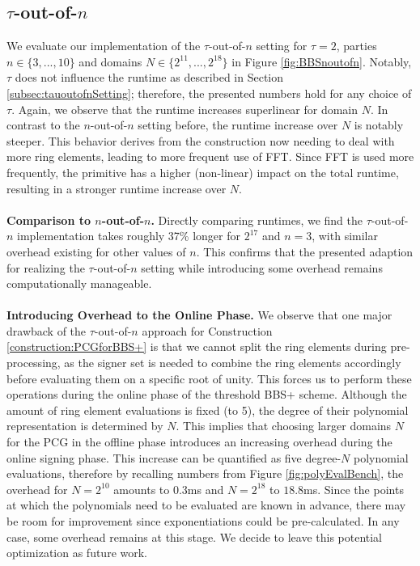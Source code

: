 \subsection{$\tau$-out-of-$n$}
We evaluate our implementation of the $\tau$-out-of-$n$ setting for $\tau = 2$, parties $n\in \{3, ..., 10\}$ and domains $N\in \{2^{11}, ...,2^{18}\}$ in Figure \ref{fig:BBSnoutofn}. Notably, $\tau$ does not influence the runtime as described in Section \ref{subsec:tauoutofnSetting}; therefore, the presented numbers hold for any choice of $\tau$. Again, we observe that the runtime increases superlinear for domain $N$. In contrast to the $n$-out-of-$n$ setting before, the runtime increase over $N$ is notably steeper. This behavior derives from the construction now needing to deal with more ring elements, leading to more frequent use of FFT. Since FFT is used more frequently, the primitive has a higher (non-linear) impact on the total runtime, resulting in a stronger runtime increase over $N$.
\\\\
\textbf{Comparison to $n$-out-of-$n$.} Directly comparing runtimes, we find the $\tau$-out-of-$n$ implementation takes roughly 37\% longer for $2^{17}$ and $n=3$, with similar overhead existing for other values of $n$. This confirms that the presented adaption for realizing the $\tau$-out-of-$n$ setting while introducing some overhead remains computationally manageable.
\\\\
\textbf{Introducing Overhead to the Online Phase.} We observe that one major drawback of the $\tau$-out-of-$n$ approach for Construction \ref{construction:PCGforBBS+} is that we cannot split the ring elements during pre-processing, as the signer set is needed to combine the ring elements accordingly before evaluating them on a specific root of unity. This forces us to perform these operations during the online phase of the threshold BBS+ scheme. Although the amount of ring element evaluations is fixed (to 5), the degree of their polynomial representation is determined by $N$. This implies that choosing larger domains $N$ for the PCG in the offline phase introduces an increasing overhead during the online signing phase. This increase can be quantified as five degree-$N$ polynomial evaluations, therefore by recalling numbers from Figure \ref{fig:polyEvalBench}, the overhead for $N=2^{10}$ amounts to $0.3$ms and $N=2^{18}$ to $18.8$ms. Since the points at which the polynomials need to be evaluated are known in advance, there may be room for improvement since exponentiations could be pre-calculated. In any case, some overhead remains at this stage. We decide to leave this potential optimization as future work.

